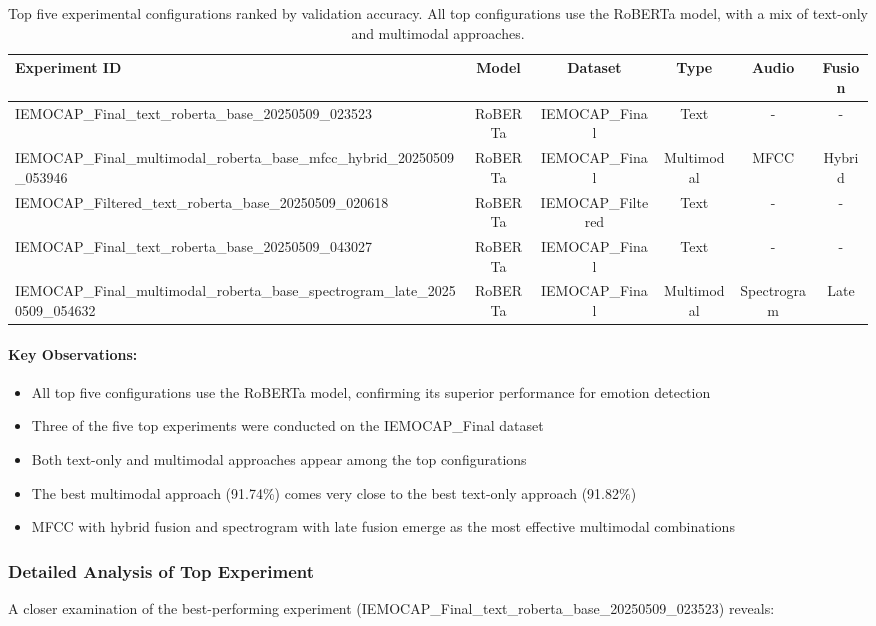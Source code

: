 \documentclass[12pt]{article}
\begin{document}
\begin{table}[h]
\centering
\begin{tabular}{|p{5.5cm}|c|c|c|c|c|}
\hline
\textbf{Experiment ID} & \textbf{Model} & \textbf{Dataset} & \textbf{Type} & \textbf{Audio} & \textbf{Fusion} \\
\hline
IEMOCAP\_Final\_text\_roberta\_base\_20250509\_023523 & RoBERTa & IEMOCAP\_Final & Text & - & - \\
\hline
IEMOCAP\_Final\_multimodal\_roberta\_base\_mfcc\_hybrid\_20250509\_053946 & RoBERTa & IEMOCAP\_Final & Multimodal & MFCC & Hybrid \\
\hline
IEMOCAP\_Filtered\_text\_roberta\_base\_20250509\_020618 & RoBERTa & IEMOCAP\_Filtered & Text & - & - \\
\hline
IEMOCAP\_Final\_text\_roberta\_base\_20250509\_043027 & RoBERTa & IEMOCAP\_Final & Text & - & - \\
\hline
IEMOCAP\_Final\_multimodal\_roberta\_base\_spectrogram\_late\_20250509\_054632 & RoBERTa & IEMOCAP\_Final & Multimodal & Spectrogram & Late \\
\hline
\end{tabular}
\caption{Top five experimental configurations ranked by validation accuracy. All top configurations use the RoBERTa model, with a mix of text-only and multimodal approaches.}
\label{tab:top_experiments}
\end{table}

\paragraph{Key Observations:}
\begin{itemize}
    \item All top five configurations use the RoBERTa model, confirming its superior performance for emotion detection
    \item Three of the five top experiments were conducted on the IEMOCAP\_Final dataset
    \item Both text-only and multimodal approaches appear among the top configurations
    \item The best multimodal approach (91.74\%) comes very close to the best text-only approach (91.82\%)
    \item MFCC with hybrid fusion and spectrogram with late fusion emerge as the most effective multimodal combinations
\end{itemize}

\subsubsection{Detailed Analysis of Top Experiment}
A closer examination of the best-performing experiment (IEMOCAP\_Final\_text\_roberta\_base\_20250509\_023523) reveals:
\end{document}
